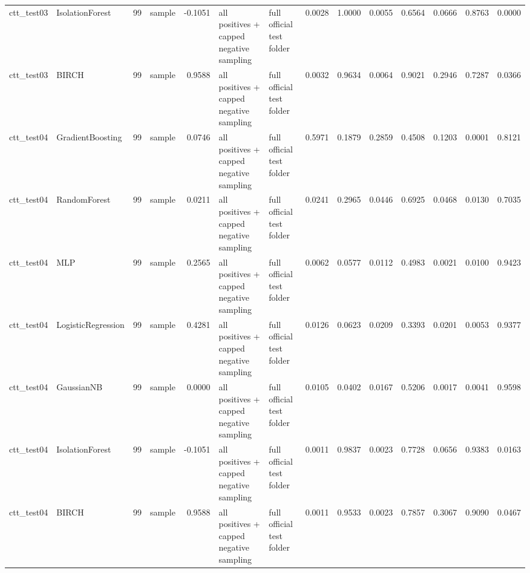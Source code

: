 \begin{tabular}{llrlrllrrrrrrr}
ctt\_test03 & IsolationForest & 99 & sample & -0.1051 & all positives + capped negative sampling & full official test folder & 0.0028 & 1.0000 & 0.0055 & 0.6564 & 0.0666 & 0.8763 & 0.0000 \\
ctt\_test03 & BIRCH & 99 & sample & 0.9588 & all positives + capped negative sampling & full official test folder & 0.0032 & 0.9634 & 0.0064 & 0.9021 & 0.2946 & 0.7287 & 0.0366 \\
ctt\_test04 & GradientBoosting & 99 & sample & 0.0746 & all positives + capped negative sampling & full official test folder & 0.5971 & 0.1879 & 0.2859 & 0.4508 & 0.1203 & 0.0001 & 0.8121 \\
ctt\_test04 & RandomForest & 99 & sample & 0.0211 & all positives + capped negative sampling & full official test folder & 0.0241 & 0.2965 & 0.0446 & 0.6925 & 0.0468 & 0.0130 & 0.7035 \\
ctt\_test04 & MLP & 99 & sample & 0.2565 & all positives + capped negative sampling & full official test folder & 0.0062 & 0.0577 & 0.0112 & 0.4983 & 0.0021 & 0.0100 & 0.9423 \\
ctt\_test04 & LogisticRegression & 99 & sample & 0.4281 & all positives + capped negative sampling & full official test folder & 0.0126 & 0.0623 & 0.0209 & 0.3393 & 0.0201 & 0.0053 & 0.9377 \\
ctt\_test04 & GaussianNB & 99 & sample & 0.0000 & all positives + capped negative sampling & full official test folder & 0.0105 & 0.0402 & 0.0167 & 0.5206 & 0.0017 & 0.0041 & 0.9598 \\
ctt\_test04 & IsolationForest & 99 & sample & -0.1051 & all positives + capped negative sampling & full official test folder & 0.0011 & 0.9837 & 0.0023 & 0.7728 & 0.0656 & 0.9383 & 0.0163 \\
ctt\_test04 & BIRCH & 99 & sample & 0.9588 & all positives + capped negative sampling & full official test folder & 0.0011 & 0.9533 & 0.0023 & 0.7857 & 0.3067 & 0.9090 & 0.0467 \\
\bottomrule
\end{tabular}
